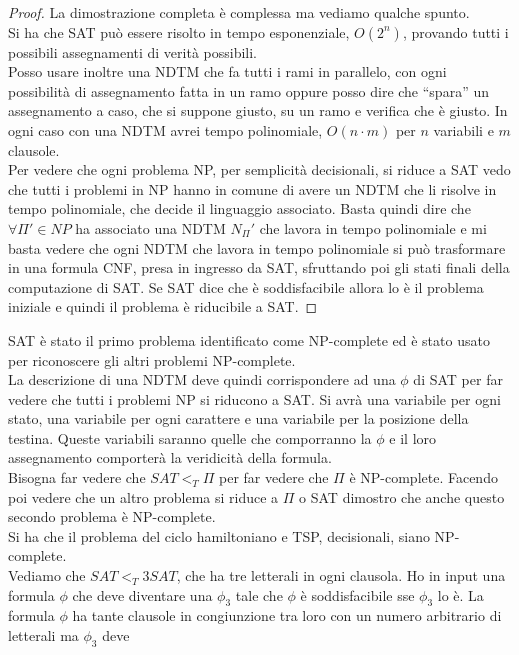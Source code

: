 \documentclass[a4paper,12pt, oneside]{book}
\begin{document}
\begin{proof}
  La dimostrazione completa è complessa ma vediamo qualche spunto.\\
  Si ha che SAT può essere risolto in tempo esponenziale, $O(2^n)$, provando
  tutti i possibili assegnamenti di verità possibili.\\
  Posso usare inoltre una NDTM che fa tutti i rami in parallelo, con ogni
  possibilità di assegnamento fatta in un ramo oppure posso dire che ``spara''
  un assegnamento a caso, che si suppone giusto, su un ramo e verifica che è
  giusto. In ogni caso con una NDTM avrei tempo polinomiale, $O(n\cdot m)$ per
  $n$ variabili e $m$ clausole.\\
  Per vedere che ogni problema NP, per semplicità decisionali, si riduce a SAT
  vedo che tutti i problemi in NP hanno in comune di avere un NDTM che li
  risolve in tempo polinomiale, che decide il linguaggio associato. Basta quindi
  dire che $\forall\Pi'\in NP$ ha associato una NDTM $N_\Pi'$ che lavora in
  tempo polinomiale e mi basta vedere che ogni NDTM che lavora in tempo
  polinomiale si può trasformare in una formula CNF, presa in ingresso da SAT,
  sfruttando poi gli stati finali della computazione di SAT. Se SAT dice che è
  soddisfacibile allora lo è il problema iniziale e quindi il problema è
  riducibile a SAT.
\end{proof}
SAT è stato il primo problema identificato come NP-complete ed è stato usato per
riconoscere gli altri problemi NP-complete.\\
La descrizione di una NDTM deve quindi corrispondere ad una $\phi$ di SAT per
far vedere che tutti i problemi NP si riducono a SAT. Si avrà una variabile per
ogni stato, una variabile per ogni carattere e una variabile per la posizione
della testina. Queste variabili saranno quelle che comporranno la $\phi$ e il
loro assegnamento comporterà la veridicità della formula.\\
Bisogna far vedere che $SAT<_T \Pi$ per far vedere che $\Pi$ è
NP-complete. Facendo poi vedere che un altro problema si riduce a $\Pi$ o SAT
dimostro che anche questo secondo problema è NP-complete. \\
Si ha che il problema del ciclo hamiltoniano e TSP, decisionali, siano
NP-complete.\\
Vediamo che $SAT<_T 3SAT$, che ha tre letterali in ogni clausola. Ho in input
una formula $\phi$ che deve diventare una $\phi_3$ tale che $\phi$ è
soddisfacibile sse $\phi_3$ lo è. La formula $\phi$ ha tante clausole in
congiunzione tra loro con un numero arbitrario di letterali ma $\phi_3$ deve
\end{document}
